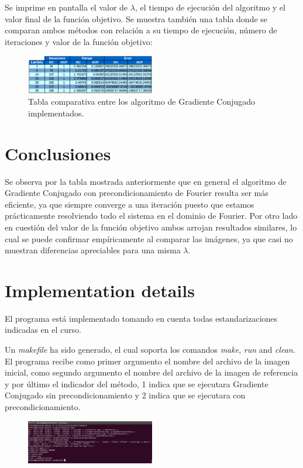 \documentclass[10pt,journal,compsoc]{styles/IEEEtran}
\begin{document}
Se imprime en pantalla el valor de $\lambda$, el tiempo de ejecución del algoritmo y el valor final de la función objetivo. Se muestra también una tabla donde se comparan ambos métodos con relación a su tiempo de ejecución, número de iteraciones y valor de la función objetivo:

\begin{figure}[hbtp]
\centering
\includegraphics[width=0.5\textwidth]{tabla.png}
\caption{Tabla comparativa entre los algoritmo de Gradiente Conjugado implementados.}
\end{figure}

\section{Conclusiones}

Se observa por la tabla mostrada anteriormente que en general el algoritmo de Gradiente Conjugado con precondicionamiento de Fourier resulta ser m\'as eficiente, ya que siempre converge a una iteración puesto que estamos prácticamente resolviendo todo el sistema en el dominio de Fourier. Por otro lado en cuestión del valor de la función objetivo ambos arrojan resultados similares, lo cual se puede confirmar empíricamente al comparar las imágenes, ya que casi no muestran diferencias apreciables para una misma $\lambda$.





\appendix
\section{Implementation details}
El programa est\'a implementado tomando en cuenta todas estandarizaciones indicadas en el curso.

Un \textit{makefile} ha sido generado, el cual soporta los comandos \textit{make}, \textit{run} and \textit{clean}. El programa recibe como primer argumento el nombre del archivo de la imagen inicial, como segundo argumento el nombre del archivo de la imagen de referencia y por \'ultimo el indicador del método, 1 indica que se ejecutara Gradiente Conjugado sin precondicionamiento y 2 indica que se ejecutara con precondicionamiento.

\begin{figure}[hbtp]
\centering
\includegraphics[width=0.5\textwidth]{screen.png}
\caption*{}
\end{figure}
\end{document}
